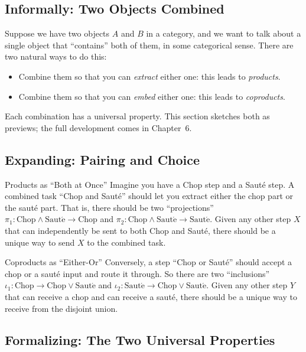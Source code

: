 \subsection{Informally: Two Objects Combined}

Suppose we have two objects $A$ and $B$ in a category, and we want to talk
about a single object that ``contains'' both of them, in some categorical
sense. There are two natural ways to do this:
\begin{itemize}
  \item Combine them so that you can \emph{extract} either one: this leads
        to \emph{products}.
  \item Combine them so that you can \emph{embed} either one: this leads
        to \emph{coproducts}.
\end{itemize}
Each combination has a universal property. This section sketches both as
previews; the full development comes in Chapter~6.

\subsection{Expanding: Pairing and Choice}

\begin{example}{Products as ``Both at Once''}
Imagine you have a Chop step and a Sauté step. A combined task ``Chop and
Sauté'' should let you extract either the chop part or the sauté part.
That is, there should be two ``projections'' $\pi_1 : \mathrm{Chop} \wedge
\mathrm{Saut\acute{e}} \to \mathrm{Chop}$ and $\pi_2 : \mathrm{Chop} \wedge
\mathrm{Saut\acute{e}} \to \mathrm{Saut\acute{e}}$. Given any other step $X$
that can independently be sent to both Chop and Sauté, there should be a
unique way to send $X$ to the combined task.
\end{example}

\begin{example}{Coproducts as ``Either-Or''}
Conversely, a step ``Chop or Sauté'' should accept a chop or a sauté
input and route it through. So there are two ``inclusions'' $\iota_1 :
\mathrm{Chop} \to \mathrm{Chop} \vee \mathrm{Saut\acute{e}}$ and $\iota_2 :
\mathrm{Saut\acute{e}} \to \mathrm{Chop} \vee \mathrm{Saut\acute{e}}$.
Given any other step $Y$ that can receive a chop and can receive a sauté,
there should be a unique way to receive from the disjoint union.
\end{example}

\subsection{Formalizing: The Two Universal Properties}

